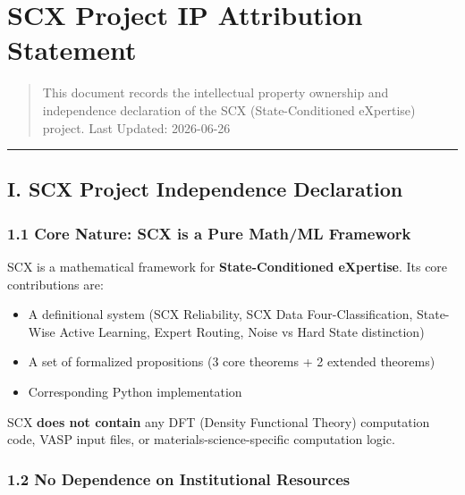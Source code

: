 \documentclass[
  12pt,
]{article}
\author{SCX}
\date{2026}
\providecommand{\tightlist}{%
  \setlength{\itemsep}{0pt}\setlength{\parskip}{0pt}}
\begin{document}
\section{SCX Project IP Attribution Statement}\label{scx-project-ip-attribution-statement}

\begin{quote}
This document records the intellectual property ownership and independence declaration of the SCX (State-Conditioned eXpertise) project. Last Updated: 2026-06-26
\end{quote}

\begin{center}\rule{0.5\linewidth}{0.5pt}\end{center}

\subsection{I. SCX Project Independence Declaration}\label{i-scx-project-independence-declaration}

\subsubsection{1.1 Core Nature: SCX is a Pure Math/ML Framework}\label{core-nature-scx-is-a-pure-mathml-framework}

SCX is a mathematical framework for \textbf{State-Conditioned eXpertise}. Its core contributions are:

\begin{itemize}
\tightlist
\item
  A definitional system (SCX Reliability, SCX Data Four-Classification, State-Wise Active Learning, Expert Routing, Noise vs Hard State distinction)
\item
  A set of formalized propositions (3 core theorems + 2 extended theorems)
\item
  Corresponding Python implementation
\end{itemize}

SCX \textbf{does not contain} any DFT (Density Functional Theory) computation code, VASP input files, or materials-science-specific computation logic.

\subsubsection{1.2 No Dependence on Institutional Resources}\label{no-dependence-on-institutional-resources}
\end{document}
